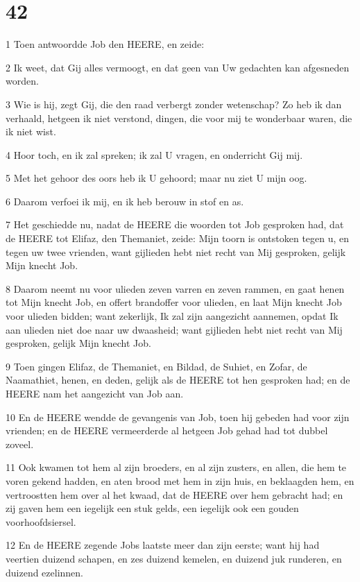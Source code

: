 \chapter{42}

\par 1 Toen antwoordde Job den HEERE, en zeide:
\par 2 Ik weet, dat Gij alles vermoogt, en dat geen van Uw gedachten kan afgesneden worden.
\par 3 Wie is hij, zegt Gij, die den raad verbergt zonder wetenschap? Zo heb ik dan verhaald, hetgeen ik niet verstond, dingen, die voor mij te wonderbaar waren, die ik niet wist.
\par 4 Hoor toch, en ik zal spreken; ik zal U vragen, en onderricht Gij mij.
\par 5 Met het gehoor des oors heb ik U gehoord; maar nu ziet U mijn oog.
\par 6 Daarom verfoei ik mij, en ik heb berouw in stof en as.
\par 7 Het geschiedde nu, nadat de HEERE die woorden tot Job gesproken had, dat de HEERE tot Elifaz, den Themaniet, zeide: Mijn toorn is ontstoken tegen u, en tegen uw twee vrienden, want gijlieden hebt niet recht van Mij gesproken, gelijk Mijn knecht Job.
\par 8 Daarom neemt nu voor ulieden zeven varren en zeven rammen, en gaat henen tot Mijn knecht Job, en offert brandoffer voor ulieden, en laat Mijn knecht Job voor ulieden bidden; want zekerlijk, Ik zal zijn aangezicht aannemen, opdat Ik aan ulieden niet doe naar uw dwaasheid; want gijlieden hebt niet recht van Mij gesproken, gelijk Mijn knecht Job.
\par 9 Toen gingen Elifaz, de Themaniet, en Bildad, de Suhiet, en Zofar, de Naamathiet, henen, en deden, gelijk als de HEERE tot hen gesproken had; en de HEERE nam het aangezicht van Job aan.
\par 10 En de HEERE wendde de gevangenis van Job, toen hij gebeden had voor zijn vrienden; en de HEERE vermeerderde al hetgeen Job gehad had tot dubbel zoveel.
\par 11 Ook kwamen tot hem al zijn broeders, en al zijn zusters, en allen, die hem te voren gekend hadden, en aten brood met hem in zijn huis, en beklaagden hem, en vertroostten hem over al het kwaad, dat de HEERE over hem gebracht had; en zij gaven hem een iegelijk een stuk gelds, een iegelijk ook een gouden voorhoofdsiersel.
\par 12 En de HEERE zegende Jobs laatste meer dan zijn eerste; want hij had veertien duizend schapen, en zes duizend kemelen, en duizend juk runderen, en duizend ezelinnen.
